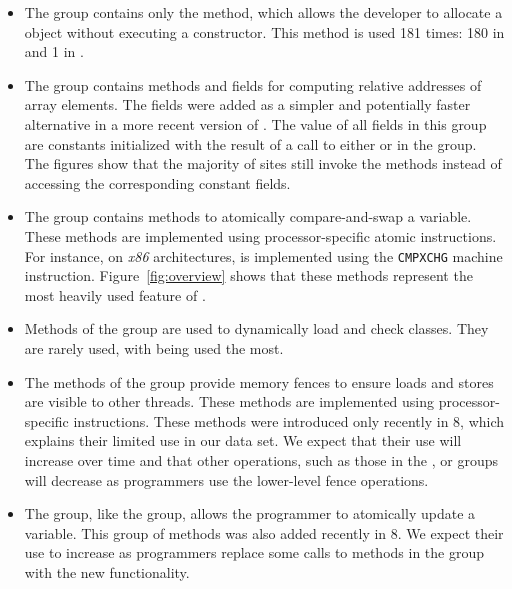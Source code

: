 \begin{itemize}
  
\item The  group contains only the   method, 
which allows the developer to allocate a \java{} object without executing a constructor.
This method is used 181 times: 180 in  and 1 in .

\item The  group contains methods and fields for computing relative addresses of array elements.
The fields were added as a simpler and potentially faster alternative in a more recent version of \unsafe{}.
The value of all fields in this group are constants initialized with the result of a call to either  or  in the  group.
The figures show that the majority of sites still invoke the methods instead of accessing the corresponding constant fields.

\item The  group contains methods to atomically compare-and-swap a \java{} variable.
These methods are implemented using processor-specific atomic instructions.
For instance, on \emph{x86} architectures,
 is implemented using the \texttt{CMPXCHG} machine instruction.
Figure~\ref{fig:overview} shows that these methods represent the most heavily used feature of \unsafe{}.

\item Methods of the  group are used to dynamically load and check \java{} classes. They are rarely used, with  being used the most.

\item 
The methods of the  group provide memory fences to ensure loads and stores are visible to other threads.
These methods are implemented using processor-specific instructions.
These methods were introduced only recently in \java{} 8, which explains their limited use in our data set.
We expect that their use will increase over time and that other operations, such as those in the , or  groups will decrease as programmers use the lower-level fence operations.

\item The  group, like the  group, allows the programmer to atomically update a \java{} variable. This group of methods was also added recently in \java{} 8. We expect their use to increase as programmers replace some calls to methods in the  group with the new functionality.


\end{itemize}
